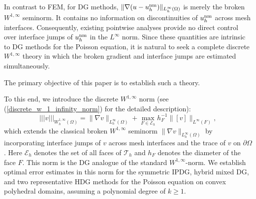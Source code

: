 \documentclass[1996/10/24]{amsart}
\theoremstyle{definition}
\numberwithin{equation}{section}
\begin{document}
In contrast to FEM, for DG methods,
$\|\nabla(u-u_h^{{\rm nm}})\|_{L_h^\infty(\Omega)}$
is merely the broken $W^{1,\infty}$ seminorm. It contains no information on discontinuities of $u_{h}^{{\rm nm}}$
across mesh interfaces. Consequently, existing pointwise analyses provide no direct control over interface jumps
of $u_{h}^{{\rm nm}}$ in the $L^{\infty}$ norm. Since these quantities are intrinsic to DG methods for the Poisson
equation, it is natural to seek a complete discrete $W^{1,\infty}$ theory in which the broken gradient and interface
jumps are estimated simultaneously.

The primary objective of this paper is to establish such a theory.

To this end, we introduce the discrete $W^{1,\infty}$ norm (see (\ref{discrete_w_1_infinity_norm}) for the detailed description):
\[
|||v|||_{W_h^{1,\infty}(\Omega)}
=\|\nabla v\|_{L_h^\infty(\Omega)}
+
\max_{F\in\mathcal E_h}
h_F^{-1}\|[v]\|_{L^\infty(F)},
\]
which extends the classical broken $W^{1,\infty}$ seminorm $\|\nabla v\|_{L_h^\infty(\Omega)}$ by incorporating interface jumps of $v$ across mesh interfaces and the trace of $v$ on $\partial\Omega$. Here $\mathcal{E}_h$ denotes the set of all faces of $\mathcal{T}_h$ and $h_F$ denotes the diameter of the face $F$. This norm is the DG analogue of the standard $W^{1,\infty}$-norm. We establish optimal error estimates in this norm for the symmetric IPDG, hybrid mixed DG, and two representative HDG methods for the Poisson equation on convex polyhedral domains, assuming a polynomial degree of $k \ge 1$.
\end{document}
